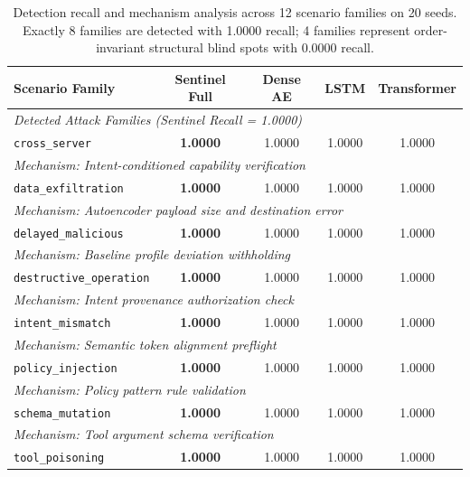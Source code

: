 \begin{table}[t]
\centering
\caption{Detection recall and mechanism analysis across 12 scenario families on 20 seeds. Exactly 8 families are detected with 1.0000 recall; 4 families represent order-invariant structural blind spots with 0.0000 recall.}
\label{tab:per_attack_recall}
\footnotesize
\setlength{\tabcolsep}{6pt}
\begin{tabular}{lcccc}
\toprule
\textbf{Scenario Family} & \textbf{Sentinel Full} & \textbf{Dense AE} & \textbf{LSTM} & \textbf{Transformer} \\
\midrule
\multicolumn{5}{l}{\textit{Detected Attack Families (Sentinel Recall = 1.0000)}} \\
\texttt{cross\_server}          & \textbf{1.0000} & 1.0000 & 1.0000 & 1.0000 \\
\multicolumn{5}{l}{\quad\textit{Mechanism: Intent-conditioned capability verification}} \\
\texttt{data\_exfiltration}     & \textbf{1.0000} & 1.0000 & 1.0000 & 1.0000 \\
\multicolumn{5}{l}{\quad\textit{Mechanism: Autoencoder payload size and destination error}} \\
\texttt{delayed\_malicious}     & \textbf{1.0000} & 1.0000 & 1.0000 & 1.0000 \\
\multicolumn{5}{l}{\quad\textit{Mechanism: Baseline profile deviation withholding}} \\
\texttt{destructive\_operation} & \textbf{1.0000} & 1.0000 & 1.0000 & 1.0000 \\
\multicolumn{5}{l}{\quad\textit{Mechanism: Intent provenance authorization check}} \\
\texttt{intent\_mismatch}       & \textbf{1.0000} & 1.0000 & 1.0000 & 1.0000 \\
\multicolumn{5}{l}{\quad\textit{Mechanism: Semantic token alignment preflight}} \\
\texttt{policy\_injection}      & \textbf{1.0000} & 1.0000 & 1.0000 & 1.0000 \\
\multicolumn{5}{l}{\quad\textit{Mechanism: Policy pattern rule validation}} \\
\texttt{schema\_mutation}       & \textbf{1.0000} & 1.0000 & 1.0000 & 1.0000 \\
\multicolumn{5}{l}{\quad\textit{Mechanism: Tool argument schema verification}} \\
\texttt{tool\_poisoning}        & \textbf{1.0000} & 1.0000 & 1.0000 & 1.0000 \\

\end{tabular}
\end{table}
